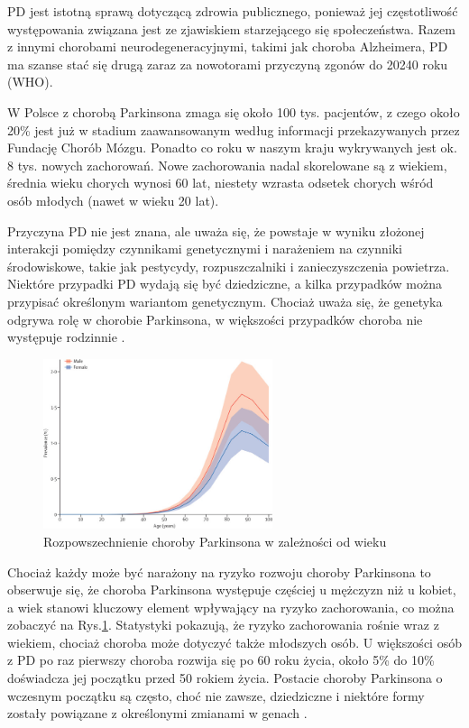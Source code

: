 PD jest istotną sprawą dotyczącą zdrowia publicznego, ponieważ jej częstotliwość występowania związana jest ze zjawiskiem starzejącego się społeczeństwa.
Razem z innymi chorobami neurodegeneracyjnymi, takimi jak choroba Alzheimera, PD ma szanse stać się drugą zaraz za nowotorami przyczyną zgonów do 20240 roku (WHO).

W Polsce z chorobą Parkinsona zmaga się około 100 tys. pacjentów, z czego około 20\% jest już w stadium zaawansowanym
według informacji przekazywanych przez Fundację Chorób Mózgu.
Ponadto co roku w naszym kraju wykrywanych jest ok. 8 tys. nowych zachorowań.
Nowe zachorowania nadal skorelowane są z wiekiem, średnia wieku chorych wynosi 60 lat, niestety wzrasta odsetek chorych wśród osób młodych (nawet w wieku 20 lat).

Przyczyna PD nie jest znana, ale uważa się, że powstaje w wyniku złożonej interakcji pomiędzy czynnikami genetycznymi i
narażeniem na czynniki środowiskowe, takie jak pestycydy, rozpuszczalniki i zanieczyszczenia powietrza.
Niektóre przypadki PD wydają się być dziedziczne, a kilka przypadków można przypisać określonym wariantom genetycznym.
Chociaż uważa się, że genetyka odgrywa rolę w chorobie Parkinsona, w większości przypadków choroba nie występuje rodzinnie \cite{National_Institute_on_Aging_2022}.

\begin{figure}[htbp]
	\centering
	\includegraphics[width=0.6\textwidth]{./img/PD_prevalence}
	\caption{Rozpowszechnienie choroby Parkinsona w zależności od wieku \cite{global_PD}}
    \label{fig:PD_prevalance}
\end{figure}

Chociaż każdy może być narażony na ryzyko rozwoju choroby Parkinsona to obserwuje się, że choroba Parkinsona występuje częściej u mężczyzn niż u kobiet,
a wiek stanowi kluczowy element wpływający na ryzyko zachorowania, co można zobaczyć na Rys.\ref{fig:PD_prevalance}.
Statystyki pokazują, że ryzyko zachorowania rośnie wraz z wiekiem, chociaż choroba może dotyczyć także młodszych osób.
U większości osób z PD po raz pierwszy choroba rozwija się po 60 roku życia, około 5\% do 10\% doświadcza jej początku przed 50 rokiem życia.
Postacie choroby Parkinsona o wczesnym początku są często, choć nie zawsze, dziedziczne i niektóre formy zostały powiązane z
określonymi zmianami w genach \cite{National_Institute_on_Aging_2022}.

